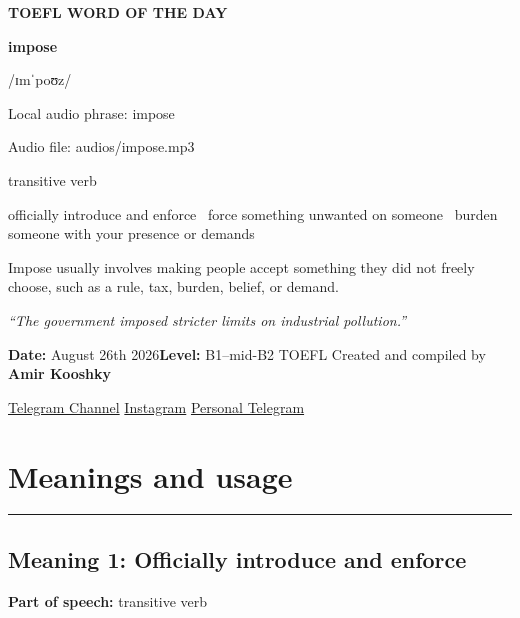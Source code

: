 \documentclass[11pt]{article}
\newcommand{\sectionrule}{\par\vspace{-0.5em}\noindent\textcolor{Accent}{\rule{\linewidth}{0.6pt}}\par}
\begin{document}
\begin{center}
{\sffamily\bfseries\color{Accent} TOEFL WORD OF THE DAY\par}
\vspace{8mm}
{\fontsize{42}{48}\selectfont\bfseries impose\par}
\vspace{2mm}
{\Large\sffamily\color{Accent} /ɪmˈpoʊz/\par}
\vspace{2mm}
{\small\sffamily Local audio phrase: impose\par}
{\small\sffamily Audio file: audios/impose.mp3\par}
\vspace{2mm}
{\large\sffamily\color{Muted} transitive verb\par}
\vspace{5mm}
{\sffamily officially introduce and enforce \textbullet\ force something unwanted on someone \textbullet\ burden someone with your presence or demands\par}
\vspace{6mm}
{\large Impose usually involves making people accept something they did not freely choose, such as a rule, tax, burden, belief, or demand.\par}
\vspace{6mm}
\begin{minipage}{0.84\textwidth}
\itshape “The government imposed stricter limits on industrial pollution.”
\end{minipage}\par
\vspace{10mm}
\textbf{Date:} August 26th 2026\quad\textbullet\quad \textbf{Level:} B1--mid-B2 TOEFL
\vfill
Created and compiled by \textbf{Amir Kooshky}\par
\vspace{2mm}
\href{https://t.me/KooshkyTOEFL}{Telegram Channel}\quad\textbullet\quad
\href{https://www.instagram.com/kooshkytoefl}{Instagram}\quad\textbullet\quad
\href{https://t.me/KooshkyTOEFL\_pv}{Personal Telegram}
\end{center}
\newpage
\tableofcontents
\newpage

\section{Meanings and usage}
\sectionrule
\subsection{Meaning 1: Officially introduce and enforce}
\textbf{Part of speech:} transitive verb
\end{document}
